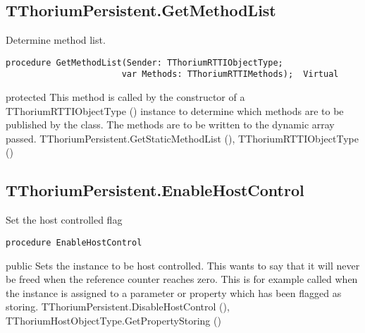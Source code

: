\subsection{TThoriumPersistent.GetMethodList}
\label{thoriumcorepkg:thorium:tthoriumpersistent:getmethodlist}
\begin{FPCList}
\Synopsis
Determine method list.\Declaration 

\begin{verbatim}
procedure GetMethodList(Sender: TThoriumRTTIObjectType;
                       var Methods: TThoriumRTTIMethods);  Virtual
\end{verbatim}
\Visibility
protected
\Description
This method is called by the constructor of a TThoriumRTTIObjectType (\pageref{thoriumcorepkg:thorium:tthoriumrttiobjecttype}) instance to determine which methods are to be published by the class. The methods are to be written to the dynamic array passed.\SeeAlso
TThoriumPersistent.GetStaticMethodList (\pageref{thoriumcorepkg:thorium:tthoriumpersistent:getstaticmethodlist}),
TThoriumRTTIObjectType (\pageref{thoriumcorepkg:thorium:tthoriumrttiobjecttype})\end{FPCList}
\subsection{TThoriumPersistent.EnableHostControl}
\label{thoriumcorepkg:thorium:tthoriumpersistent:enablehostcontrol}
\begin{FPCList}
\Synopsis
Set the host controlled flag\Declaration 

\begin{verbatim}
procedure EnableHostControl
\end{verbatim}
\Visibility
public
\Description
Sets the instance to be host controlled. This wants to say that it will never be freed when the reference counter reaches zero. This is for example called when the instance is assigned to a parameter or property which has been flagged as storing.\SeeAlso
TThoriumPersistent.DisableHostControl (\pageref{thoriumcorepkg:thorium:tthoriumpersistent:disablehostcontrol}),
TThoriumHostObjectType.GetPropertyStoring (\pageref{thoriumcorepkg:thorium:tthoriumhostobjecttype:getpropertystoring})\end{FPCList}
